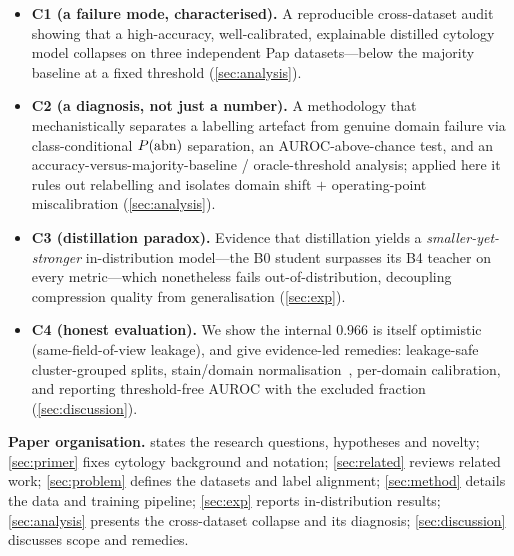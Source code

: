\begin{itemize}[leftmargin=1.2em,itemsep=1pt,topsep=2pt]
\item \textbf{C1 (a failure mode, characterised).} A reproducible cross-dataset audit showing that a
high-accuracy, well-calibrated, explainable distilled cytology model collapses on three independent
Pap datasets---below the majority baseline at a fixed threshold (\cref{sec:analysis}).
\item \textbf{C2 (a diagnosis, not just a number).} A methodology that mechanistically separates a
labelling artefact from genuine domain failure via class-conditional $P(\mathrm{abn})$ separation, an
AUROC-above-chance test, and an accuracy-versus-majority-baseline / oracle-threshold analysis;
applied here it rules out relabelling and isolates domain shift $+$ operating-point miscalibration
(\cref{sec:analysis}).
\item \textbf{C3 (distillation paradox).} Evidence that distillation yields a \emph{smaller-yet-stronger}
in-distribution model---the B0 student surpasses its B4 teacher on every metric---which nonetheless
fails out-of-distribution, decoupling compression quality from generalisation (\cref{sec:exp}).
\item \textbf{C4 (honest evaluation).} We show the internal $0.966$ is itself optimistic
(same-field-of-view leakage), and give evidence-led remedies: leakage-safe cluster-grouped splits,
stain/domain normalisation~\cite{macenko2009stain}, per-domain calibration, and reporting
threshold-free AUROC with the excluded fraction (\cref{sec:discussion}).
\end{itemize}

\noindent\textbf{Paper organisation.}  states the research questions, hypotheses
and novelty; \cref{sec:primer} fixes cytology background and notation; \cref{sec:related} reviews
related work; \cref{sec:problem} defines the datasets and label alignment; \cref{sec:method} details
the data and training pipeline; \cref{sec:exp} reports in-distribution results; \cref{sec:analysis}
presents the cross-dataset collapse and its diagnosis; \cref{sec:discussion} discusses scope and
remedies.

